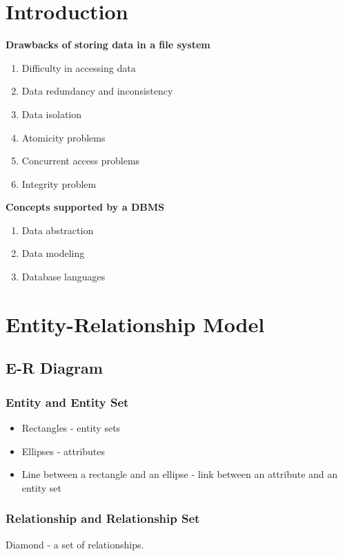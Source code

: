 \documentclass[11pt,a4paper]{article}
\begin{document}
\makenotestitle

\tableofcontents
\newpage
{}

\section{Introduction}
\textbf{Drawbacks of storing data in a file system}
\begin{enumerate}
    \item [1.] Difficulty in accessing data
    \item [2.] Data redundancy and inconsistency
    \item [3.] Data isolation
    \item [4.] Atomicity problems
    \item [5.] Concurrent access problems
    \item [6.] Integrity problem
\end{enumerate}

\textbf{Concepts supported by a DBMS}
\begin{enumerate}
    \item [1.] Data abstraction
    \item [2.] Data modeling
    \item [3.] Database languages
\end{enumerate}

\section{Entity-Relationship Model}
\subsection{E-R Diagram}
\subsubsection{Entity and Entity Set}
\begin{itemize}
    \item Rectangles - entity sets
    \item Ellipses - attributes
    \item Line between a rectangle and an ellipse - link between an attribute and an entity set
\end{itemize}

\subsubsection{Relationship and Relationship Set}
Diamond - a set of relationships.
\end{document}
